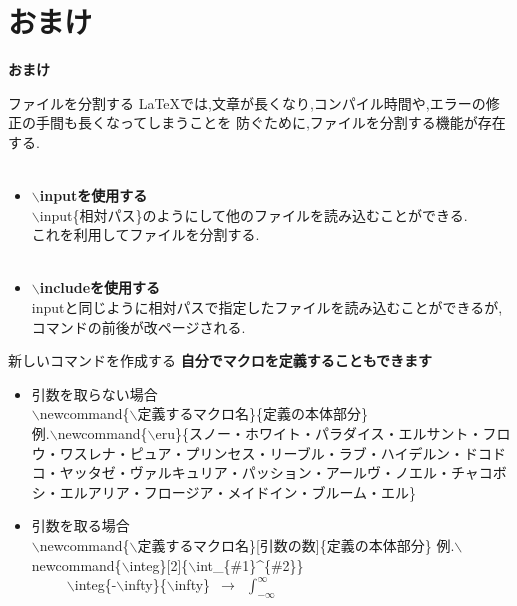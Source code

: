 \documentclass[dvipdfmx]{beamer}
\newcommand{\tbs}{$\backslash$}
\begin{document}
  \section{おまけ}
  \begin{frame}
    \centering\Huge\bf
    おまけ
  \end{frame}
  \begin{frame}{ファイルを分割する}
    \scriptsize
    \LaTeX では,文章が長くなり,コンパイル時間や,エラーの修正の手間も長くなってしまうことを
    防ぐために,ファイルを分割する機能が存在する.\\~\\
    \begin{itemize}
      \item {\normalsize\bf\tbs inputを使用する}\\
            \tbs input\{相対パス\}のようにして他のファイルを読み込むことができる.\\
            これを利用してファイルを分割する.\\~\\
      \item {\normalsize\bf\tbs includeを使用する}\\
            inputと同じように相対パスで指定したファイルを読み込むことができるが,
            コマンドの前後が改ページされる.
    \end{itemize}
  \end{frame}
  \begin{frame}{新しいコマンドを作成する}
    \Large\bf
    自分でマクロを定義することもできます
    \begin{itemize}
      \item {\scriptsize 引数を取らない場合}\\
        {\scriptsize \tbs newcommand\{\tbs 定義するマクロ名\}\{定義の本体部分\}}\\
        {\tiny 例.\tbs newcommand\{\tbs eru\}\{スノー・ホワイト・パラダイス・エルサント・フロウ・ワスレナ・ピュア・プリンセス・リーブル・ラブ・ハイデルン・ドコドコ・ヤッタゼ・ヴァルキュリア・パッション・アールヴ・ノエル・チャコボシ・エルアリア・フロージア・メイドイン・ブルーム・エル\}}
      \item {\scriptsize 引数を取る場合}\\
        {\scriptsize \tbs newcommand\{\tbs 定義するマクロ名\}[引数の数]\{定義の本体部分\}}
        {\tiny 例.\tbs newcommand\{\tbs integ\}[2]\{\tbs int\_\{\#1\}\textasciicircum\{\#2\}\}}\\
        {\tiny ~~~~~\tbs integ\{-\tbs infty\}\{\tbs infty\}~$\rightarrow$~$\int_{-\infty}^{\infty}$}
    \end{itemize}
  \end{frame}
\end{document}
